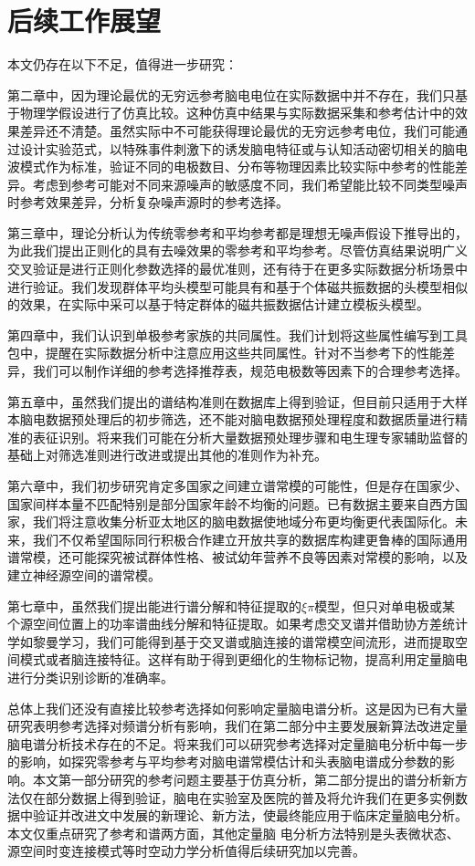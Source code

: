 \section{后续工作展望}
本文仍存在以下不足，值得进一步研究：

第二章中，因为理论最优的无穷远参考脑电电位在实际数据中并不存在，我们只基于物理学假设进行了仿真比较。这种仿真中结果与实际数据采集和参考估计中的效果差异还不清楚。虽然实际中不可能获得理论最优的无穷远参考电位，我们可能通过设计实验范式，以特殊事件刺激下的诱发脑电特征或与认知活动密切相关的脑电波模式作为标准，验证不同的电极数目、分布等物理因素比较实际中参考的性能差异。考虑到参考可能对不同来源噪声的敏感度不同，我们希望能比较不同类型噪声时参考效果差异，分析复杂噪声源时的参考选择。

第三章中，理论分析认为传统零参考和平均参考都是理想无噪声假设下推导出的，为此我们提出正则化的具有去噪效果的零参考和平均参考。尽管仿真结果说明广义交叉验证是进行正则化参数选择的最优准则，还有待于在更多实际数据分析场景中进行验证。我们发现群体平均头模型可能具有和基于个体磁共振数据的头模型相似的效果，在实际中采可以基于特定群体的磁共振数据估计建立模板头模型。

第四章中，我们认识到单极参考家族的共同属性。我们计划将这些属性编写到工具包中，提醒在实际数据分析中注意应用这些共同属性。针对不当参考下的性能差异，我们可以制作详细的参考选择推荐表，规范电极数等因素下的合理参考选择。

第五章中，虽然我们提出的谱结构准则在数据库上得到验证，但目前只适用于大样本脑电数据预处理后的初步筛选，还不能对脑电数据预处理程度和数据质量进行精准的表征识别。将来我们可能在分析大量数据预处理步骤和电生理专家辅助监督的基础上对筛选准则进行改进或提出其他的准则作为补充。

第六章中，我们初步研究肯定多国家之间建立谱常模的可能性，但是存在国家少、国家间样本量不匹配特别是部分国家年龄不均衡的问题。已有数据主要来自西方国家，我们将注意收集分析亚太地区的脑电数据使地域分布更均衡更代表国际化。未来，我们不仅希望国际同行积极合作建立开放共享的数据库构建更鲁棒的国际通用谱常模，还可能探究被试群体性格、被试幼年营养不良等因素对常模的影响，以及建立神经源空间的谱常模。

第七章中，虽然我们提出能进行谱分解和特征提取的$\xi\pi$模型，但只对单电极或某个源空间位置上的功率谱曲线分解和特征提取。如果考虑交叉谱并借助协方差统计学如黎曼学习，我们可能得到基于交叉谱或脑连接的谱常模空间流形，进而提取空间模式或者脑连接特征。这样有助于得到更细化的生物标记物，提高利用定量脑电进行分类识别诊断的准确率。

总体上我们还没有直接比较参考选择如何影响定量脑电谱分析。这是因为已有大量研究表明参考选择对频谱分析有影响，我们在第二部分中主要发展新算法改进定量脑电谱分析技术存在的不足。将来我们可以研究参考选择对定量脑电分析中每一步的影响，如探究零参考与平均参考对脑电谱常模估计和头表脑电谱成分参数的影响。本文第一部分研究的参考问题主要基于仿真分析，第二部分提出的谱分析新方法仅在部分数据上得到验证，脑电在实验室及医院的普及将允许我们在更多实例数据中验证并改进文中发展的新理论、新方法，使最终能应用于临床定量脑电分析。本文仅重点研究了参考和谱两方面，其他定量脑
电分析方法特别是头表微状态、源空间时变连接模式等时空动力学分析值得后续研究加以完善。